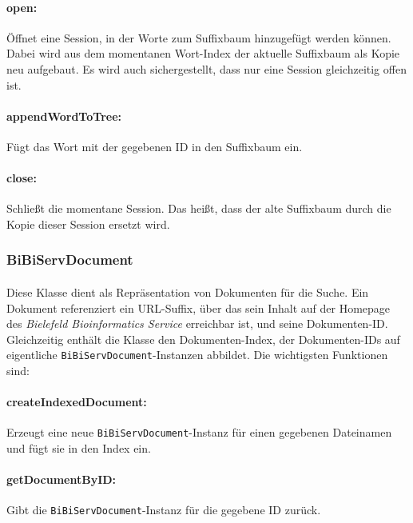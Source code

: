 \paragraph{open:} Öffnet eine Session, in der Worte zum Suffixbaum hinzugefügt werden können. Dabei wird aus dem momentanen Wort-Index der aktuelle Suffixbaum als Kopie neu aufgebaut. Es wird auch sichergestellt, dass nur eine Session gleichzeitig offen ist.

\paragraph{appendWordToTree:} Fügt das Wort mit der gegebenen ID in den Suffixbaum ein.

\paragraph{close:} Schließt die momentane Session. Das heißt, dass der alte Suffixbaum durch die Kopie dieser Session ersetzt wird.

\subsubsection{BiBiServDocument}
\label{arch-docIndex}

\paragraph{} Diese Klasse dient als Repräsentation von Dokumenten für die Suche. Ein Dokument referenziert ein URL-Suffix, über das sein Inhalt auf der Homepage des \textit{Bielefeld Bioinformatics Service} erreichbar ist, und seine Dokumenten-ID. Gleichzeitig enthält die Klasse den Dokumenten-Index, der Dokumenten-IDs auf eigentliche \texttt{BiBiServDocument}-Instanzen abbildet. Die wichtigsten Funktionen sind:

\paragraph{createIndexedDocument:} Erzeugt eine neue \texttt{BiBiServDocument}-Instanz für einen gegebenen Dateinamen und fügt sie in den Index ein.

\paragraph{getDocumentByID:} Gibt die \texttt{BiBiServDocument}-Instanz für die gegebene ID zurück.

